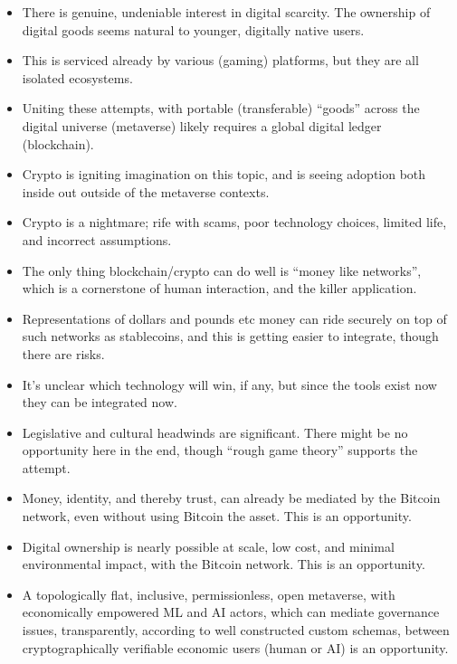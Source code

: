 {\begin{itemize}
\item There is genuine, undeniable interest in digital scarcity. The ownership of digital goods seems natural to younger, digitally native users.
\item This is serviced already by various (gaming) platforms, but they are all isolated ecosystems.
\item Uniting these attempts, with portable (transferable) ``goods'' across the digital universe (metaverse) likely requires a global digital ledger (blockchain).
\item Crypto is igniting imagination on this topic, and is seeing adoption both inside out outside of the metaverse contexts.
\item Crypto is a nightmare; rife with scams, poor technology choices, limited life, and incorrect assumptions.
\item The only thing blockchain/crypto can do well is ``money like networks'', which is a cornerstone of human interaction, and the killer application.
\item Representations of dollars and pounds etc money can ride securely on top of such networks as stablecoins, and this is getting easier to integrate, though there are risks.
\item It's unclear which technology will win, if any, but since the tools exist now they can be integrated now.
\item Legislative and cultural headwinds are significant. There might be no opportunity here in the end, though ``rough game theory'' supports the attempt.
\item Money, identity, and thereby trust, can already be mediated by the Bitcoin network, even without using Bitcoin the asset. This is an opportunity.
\item Digital ownership is nearly possible at scale, low cost, and minimal environmental impact, with the Bitcoin network. This is an opportunity.
\item A topologically flat, inclusive, permissionless, open metaverse, with economically empowered ML and AI actors, which can mediate governance issues, transparently, according to well constructed custom schemas, between cryptographically verifiable economic users (human or AI) is an opportunity.
\end{itemize}
}
